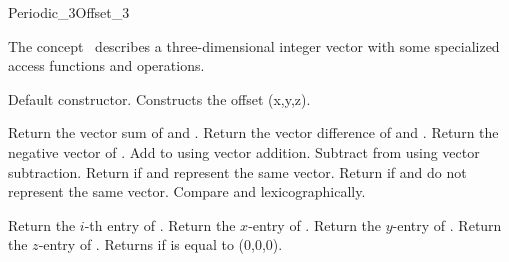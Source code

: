 
\begin{ccRefConcept}{Periodic_3Offset_3}

\ccDefinition
The concept \ccRefName\ describes a three-dimensional integer vector
with some specialized access functions and operations.

\ccCreation
{}


{Default constructor.}
\ccGlue
{}
{Constructs the offset (x,y,z).}

\ccOperations
{}
{Return the vector sum of  and .}
\ccGlue
{}
{Return the vector difference of  and .}
\ccGlue
{}
{Return the negative vector of .}
\ccGlue
{}
{Add  to  using vector addition.}
\ccGlue
{}
{Subtract  from  using vector subtraction.}
\ccGlue
{}
{Return  if  and  represent the same vector.}
\ccGlue
{}
{Return  if  and  do not represent the same
  vector.}
\ccGlue
{}
{Compare  and  lexicographically.}

\ccAccessFunctions

{Return the $i$-th entry of .}
\ccGlue
{}
{Return the $x$-entry of .}
\ccGlue
{}
{Return the $y$-entry of .}
\ccGlue
{}
{Return the $z$-entry of .}
\ccGlue
{}
{Returns  if  is equal to (0,0,0).}


\end{ccRefConcept}

